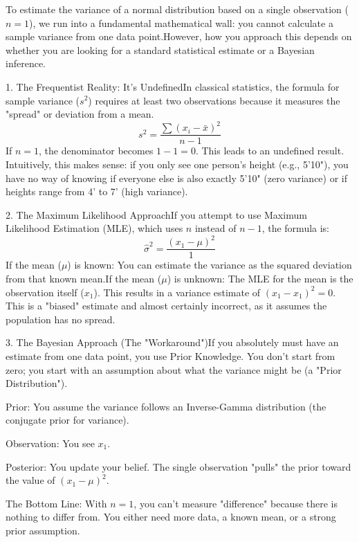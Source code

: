 \documentclass{report}
\begin{document}
\begin{sol}

    To estimate the variance of a normal distribution based on a single observation ($n=1$), we run into a fundamental mathematical wall: you cannot calculate a sample variance from one data point.However, how you approach this depends on whether you are looking for a standard statistical estimate or a Bayesian inference.
    
    1. The Frequentist Reality: It's UndefinedIn classical statistics, the formula for sample variance ($s^2$) requires at least two observations because it measures the "spread" or deviation from a mean.$$s^2 = \frac{\sum (x_i - \bar{x})^2}{n-1}$$If $n=1$, the denominator becomes $1-1=0$. This leads to an undefined result. Intuitively, this makes sense: if you only see one person's height (e.g., 5'10"), you have no way of knowing if everyone else is also exactly 5'10" (zero variance) or if heights range from 4' to 7' (high variance).
    
    2. The Maximum Likelihood ApproachIf you attempt to use Maximum Likelihood Estimation (MLE), which uses $n$ instead of $n-1$, the formula is:$$\hat{\sigma}^2 = \frac{(x_1 - \mu)^2}{1}$$If the mean ($\mu$) is known: You can estimate the variance as the squared deviation from that known mean.If the mean ($\mu$) is unknown: The MLE for the mean is the observation itself ($x_1$). This results in a variance estimate of $(x_1 - x_1)^2 = 0$. This is a "biased" estimate and almost certainly incorrect, as it assumes the population has no spread.
    
    3. The Bayesian Approach (The "Workaround")If you absolutely must have an estimate from one data point, you use Prior Knowledge. You don't start from zero; you start with an assumption about what the variance might be (a "Prior Distribution").
    
    Prior: You assume the variance follows an Inverse-Gamma distribution (the conjugate prior for variance).
    
    Observation: You see $x_1$.
    
    Posterior: You update your belief. The single observation "pulls" the prior toward the value of $(x_1 - \mu)^2$.

    The Bottom Line: With $n=1$, you can't measure "difference" because there is nothing to differ from. You either need more data, a known mean, or a strong prior assumption.

\end{sol}
\end{document}
